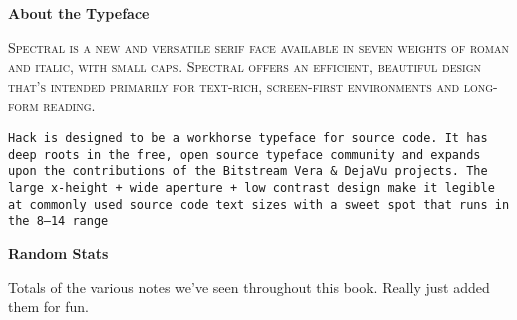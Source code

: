 \begin{center}
{\noindent\Large\textbf{About the Typeface}}

\entryskip

\begin{minipage}{0.5\textwidth}\small
\noindent\textsc{Spectral is a new and versatile serif face available in seven weights of roman and italic, with small caps.
Spectral offers an efficient, beautiful design that’s intended primarily for text-rich, screen-first environments and long-form reading.}

\entryskip

\noindent\texttt{Hack is designed to be a workhorse typeface for source code.
It has deep roots in the free, open source typeface community and expands upon the contributions of the Bitstream Vera \& DejaVu projects.
The large x-height + wide aperture + low contrast design make it legible at commonly used source code text sizes with a sweet spot that runs in the 8--14 range}
\end{minipage}
\end{center}

\clearpage
{}
\begin{center}
{\Large\textbf{Random Stats}}

\entryskip

\begin{minipage}{0.6\textwidth}
Totals of the various notes we've seen throughout this book.
Really just added them for fun.
\begin{description}\scshape\large
    \item [Commentary Notes] \thecommcounter
    \item [Todo Notes] \thetodocounter
    \item [Thought Notes] \thethoughtcounter
    \item [Date Notes] \thedatecounter
    \item [Footnotes] \thefootcounter
    \item [Quotes] \theepicounter
\end{description}
\end{minipage}
\end{center}

